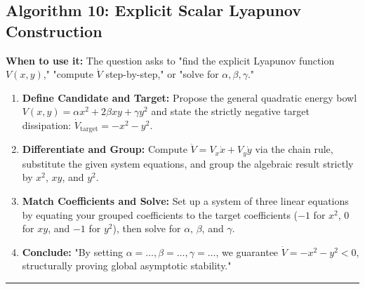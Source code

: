 \documentclass[11pt, a4paper]{report}
\begin{document}
\subsection*{Algorithm 10: Explicit Scalar Lyapunov Construction}
\textbf{When to use it:} The question asks to "find the explicit Lyapunov function $V(x,y)$," "compute $\dot{V}$ step-by-step," or "solve for $\alpha, \beta, \gamma$."
\begin{enumerate}[label=\textbf{\arabic*.}]
    \item \textbf{Define Candidate and Target:} Propose the general quadratic energy bowl $V(x,y) = \alpha x^2 + 2\beta xy + \gamma y^2$ and state the strictly negative target dissipation: $\dot{V}_{\text{target}} = -x^2 - y^2$.
    \item \textbf{Differentiate and Group:} Compute $\dot{V} = V_x\dot{x} + V_y\dot{y}$ via the chain rule, substitute the given system equations, and group the algebraic result strictly by $x^2$, $xy$, and $y^2$.
    \item \textbf{Match Coefficients and Solve:} Set up a system of three linear equations by equating your grouped coefficients to the target coefficients ($-1$ for $x^2$, $0$ for $xy$, and $-1$ for $y^2$), then solve for $\alpha$, $\beta$, and $\gamma$.
    \item \textbf{Conclude:} "By setting $\alpha=\dots, \beta=\dots, \gamma=\dots$, we guarantee $\dot{V} = -x^2 - y^2 < 0$, structurally proving global asymptotic stability."
\end{enumerate}
\vspace{1em}
\noindent\rule{\textwidth}{0.4pt}
\vspace{1em}
\end{document}
